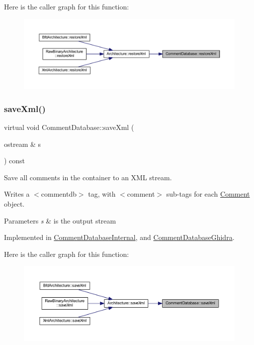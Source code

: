 Here is the caller graph for this function\+:
\nopagebreak
\begin{figure}[H]
\begin{center}
\leavevmode
\includegraphics[width=350pt]{class_comment_database_a21e8b98e7f4276e239f6b2ea59191ded_icgraph}
\end{center}
\end{figure}
\mbox{\label{class_comment_database_ab80e2cbdabe2e275695c5980b8f8eb9a}} 
\subsubsection{\texorpdfstring{saveXml()}{saveXml()}}
{\footnotesize\ttfamily virtual void Comment\+Database\+::save\+Xml (\begin{DoxyParamCaption}\item[{ostream \&}]{s }\end{DoxyParamCaption}) const\hspace{0.3cm}{\ttfamily [pure virtual]}}



Save all comments in the container to an X\+ML stream. 

Writes a $<$commentdb$>$ tag, with $<$comment$>$ sub-\/tags for each \mbox{\hyperlink{class_comment}{Comment}} object. 
\begin{DoxyParams}{Parameters}
{\em s} & is the output stream \\
\hline
\end{DoxyParams}


Implemented in \mbox{\hyperlink{class_comment_database_internal_ace5b454d66acbc275e8cf20defc0e242}{Comment\+Database\+Internal}}, and \mbox{\hyperlink{class_comment_database_ghidra_aed8e6973a2bfb1077970a2db93e4bde1}{Comment\+Database\+Ghidra}}.

Here is the caller graph for this function\+:
\nopagebreak
\begin{figure}[H]
\begin{center}
\leavevmode
\includegraphics[width=350pt]{class_comment_database_ab80e2cbdabe2e275695c5980b8f8eb9a_icgraph}
\end{center}
\end{figure}



